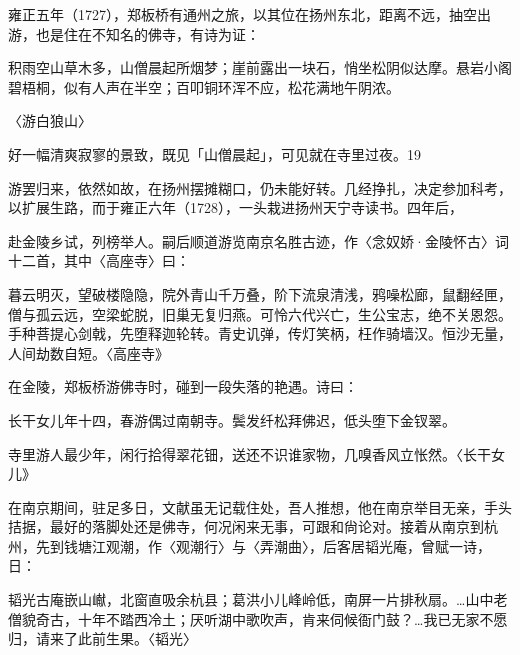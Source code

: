 雍正五年（1727），郑板桥有通州之旅，以其位在扬州东北，距离不远，抽空出游，也是住在不知名的佛寺，有诗为证：

\begin{BookQuote}
积雨空山草木多，山僧晨起所烟梦；崖前露出一块石，悄坐松阴似达摩。悬岩小阁碧梧桐，似有人声在半空；百叩铜环浑不应，松花满地午阴浓。
\end{BookQuote}

〈游白狼山〉

好一幅清爽寂寥的景致，既见「山僧晨起」，可见就在寺里过夜。19

游罢归来，依然如故，在扬州摆摊糊口，仍未能好转。几经挣扎，决定参加科考，以扩展生路，而于雍正六年（1728），一头栽进扬州天宁寺读书。四年后，

\vfill
\begin{BookNotes}
\end{BookNotes}

\noindent 赴金陵乡试，列榜举人。嗣后顺道游览南京名胜古迹，作〈念奴娇·金陵怀古〉词十二首，其中〈高座寺〉曰：

\begin{BookQuote}
暮云明灭，望破楼隐隐，院外青山千万叠，阶下流泉清浅，鸦噪松廊，鼠翻经匣，僧与孤云远，空梁蛇脱，旧巢无复归燕。可怜六代兴亡，生公宝志，绝不关恩怨。手种菩提心剑戟，先堕释迦轮转。青史讥弹，传灯笑柄，枉作骑墙汉。恒沙无量，人间劫数自短。〈高座寺》
\end{BookQuote}

在金陵，郑板桥游佛寺时，碰到一段失落的艳遇。诗曰：

\begin{BookQuote}
长干女儿年十四，春游偶过南朝寺。鬓发纤松拜佛迟，低头堕下金钗翠。
\end{BookQuote}

寺里游人最少年，闲行拾得翠花钿，送还不识谁家物，几嗅香风立怅然。〈长干女儿》

在南京期间，驻足多日，文献虽无记载住处，吾人推想，他在南京举目无亲，手头拮据，最好的落脚处还是佛寺，何况闲来无事，可跟和尙论对。接着从南京到杭州，先到钱塘江观潮，作〈观潮行〉与〈弄潮曲〉，后客居韬光庵，曾赋一诗，日：

\begin{BookQuote}
韬光古庵嵌山𪩘，北窗直吸余杭县；葛洪小儿峰岭低，南屏一片排秋扇。…山中老僧貌奇古，十年不踏西冷土；厌听湖中歌吹声，肯来伺候衙门鼓？…我已无家不愿归，请来了此前生果。〈韬光〉
\end{BookQuote}


